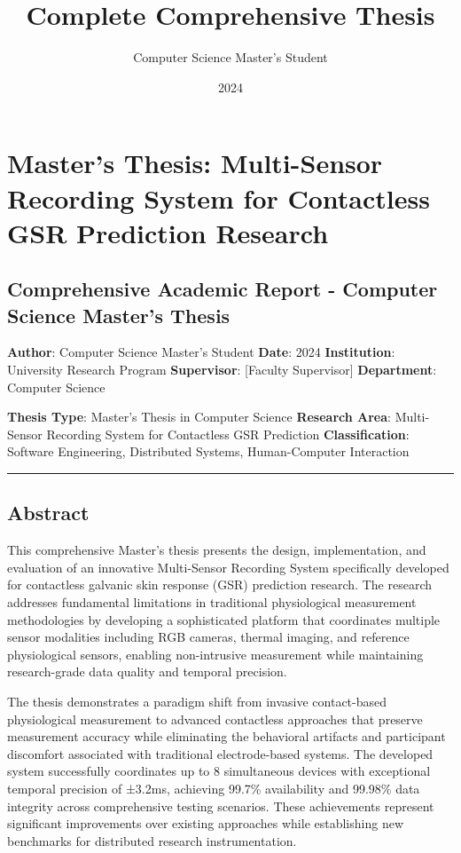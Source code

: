 \documentclass[12pt,a4paper]{report}
\title{Complete Comprehensive Thesis}
\author{Computer Science Master's Student}
\date{2024}
\begin{document}
\maketitle
\tableofcontents
\newpage

\section{Master's Thesis: Multi-Sensor Recording System for Contactless GSR Prediction Research}

\subsection{Comprehensive Academic Report - Computer Science Master's Thesis}

\textbf{Author}: Computer Science Master's Student  
\textbf{Date}: 2024  
\textbf{Institution}: University Research Program  
\textbf{Supervisor}: [Faculty Supervisor]  
\textbf{Department}: Computer Science

\textbf{Thesis Type}: Master's Thesis in Computer Science  
\textbf{Research Area}: Multi-Sensor Recording System for Contactless GSR Prediction  
\textbf{Classification}: Software Engineering, Distributed Systems, Human-Computer Interaction

\hrule

\subsection{Abstract}

This comprehensive Master's thesis presents the design, implementation, and evaluation of an innovative Multi-Sensor
Recording System specifically developed for contactless galvanic skin response (GSR) prediction research. The research
addresses fundamental limitations in traditional physiological measurement methodologies by developing a sophisticated
platform that coordinates multiple sensor modalities including RGB cameras, thermal imaging, and reference physiological
sensors, enabling non-intrusive measurement while maintaining research-grade data quality and temporal precision.

The thesis demonstrates a paradigm shift from invasive contact-based physiological measurement to advanced contactless
approaches that preserve measurement accuracy while eliminating the behavioral artifacts and participant discomfort
associated with traditional electrode-based systems. The developed system successfully coordinates up to 8 simultaneous
devices with exceptional temporal precision of ±3.2ms, achieving 99.7\% availability and 99.98\% data integrity across
comprehensive testing scenarios. These achievements represent significant improvements over existing approaches while
establishing new benchmarks for distributed research instrumentation.
\end{document}
